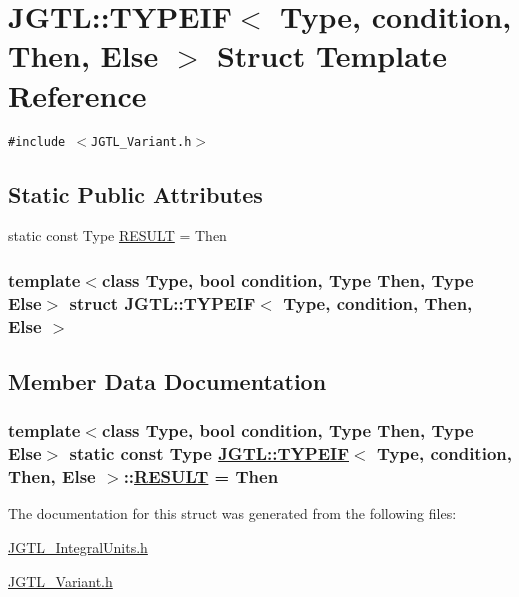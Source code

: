 \hypertarget{struct_j_g_t_l_1_1_t_y_p_e_i_f}{
\section{JGTL::TYPEIF$<$ Type, condition, Then, Else $>$ Struct Template Reference}
\label{struct_j_g_t_l_1_1_t_y_p_e_i_f}
}
{\tt \#include $<$JGTL\_\-Variant.h$>$}

\subsection*{Static Public Attributes}
\begin{CompactItemize}
\item 
static const Type \hyperlink{struct_j_g_t_l_1_1_t_y_p_e_i_f_32bbd4cf6dfad4d3958daaf453880902}{RESULT} = Then
\end{CompactItemize}
\subsubsection*{template$<$class Type, bool condition, Type Then, Type Else$>$ struct JGTL::TYPEIF$<$ Type, condition, Then, Else $>$}



\subsection{Member Data Documentation}
\hypertarget{struct_j_g_t_l_1_1_t_y_p_e_i_f_32bbd4cf6dfad4d3958daaf453880902}{
\subsubsection[RESULT]{\setlength{\rightskip}{0pt plus 5cm}template$<$class Type, bool condition, Type Then, Type Else$>$ static const Type \hyperlink{struct_j_g_t_l_1_1_t_y_p_e_i_f}{JGTL::TYPEIF}$<$ Type, condition, Then, Else $>$::\hyperlink{struct_j_g_t_l_1_1_t_y_p_e_i_f_32bbd4cf6dfad4d3958daaf453880902}{RESULT} = Then}}
\label{struct_j_g_t_l_1_1_t_y_p_e_i_f_32bbd4cf6dfad4d3958daaf453880902}




The documentation for this struct was generated from the following files:\begin{CompactItemize}
\item 
\hyperlink{_j_g_t_l___integral_units_8h}{JGTL\_\-Integral\-Units.h}\item 
\hyperlink{_j_g_t_l___variant_8h}{JGTL\_\-Variant.h}\end{CompactItemize}
